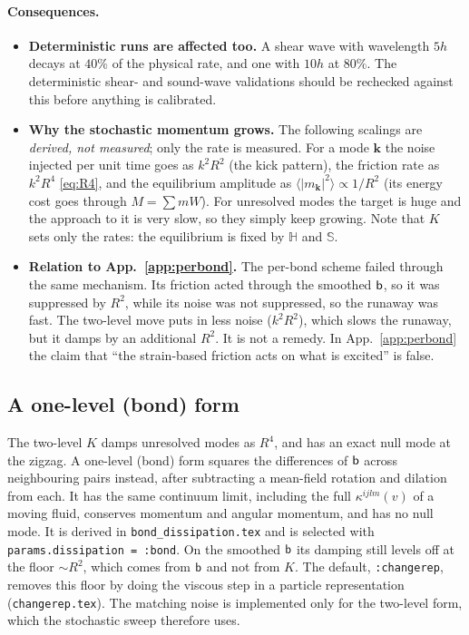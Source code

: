 \documentclass[12pt,aps,preprint,nofootinbib,noshowkeys,noshowpacs,longbibliography,superscriptaddress,tightenlines]{revtex4-2}
\def\Sbb{{\mathbb S}}
\def\bbeta{{\sf b}}
\def\app#1{App.~\ref{#1}}
\begin{document}
\paragraph{Consequences.}
\begin{itemize}
  \item \textbf{Deterministic runs are affected too.}  A shear wave with
        wavelength $5h$ decays at $40\%$ of the physical rate, and one with
        $10h$ at $80\%$.  The deterministic shear- and sound-wave validations
        should be rechecked against this before anything is calibrated.
  \item \textbf{Why the stochastic momentum grows.}  The following scalings are
        \emph{derived, not measured}; only the rate is measured.  For a mode
        $\mathbf k$ the noise injected per unit time goes as $k^2R^2$ (the
        kick pattern), the friction rate as $k^2R^4$ \eqref{eq:R4}, and the
        equilibrium amplitude as $\langle|m_{\mathbf k}|^2\rangle\propto1/R^2$
        (its energy cost goes through $M=\sum mW$).  For unresolved modes the
        target is huge and the approach to it is very slow, so they simply keep
        growing.  Note that $K$ sets only the rates: the equilibrium is fixed by
        $\mathbb H$ and $\Sbb$.
  \item \textbf{Relation to \app{app:perbond}.}  The per-bond scheme failed
        through the same mechanism.  Its friction acted through the smoothed
        $\bbeta$, so it was suppressed by $R^2$, while its noise was not
        suppressed, so the runaway was fast.  The two-level move puts in less
        noise ($k^2R^2$), which slows the runaway, but it damps by an
        additional $R^2$.  It is not a remedy.  In \app{app:perbond} the
        claim that ``the strain-based friction acts on what is excited'' is
        false.
\end{itemize}

\subsection{A one-level (bond) form}
\label{sec:bond}

The two-level $K$ damps unresolved modes as $R^4$, and has an exact null mode
at the zigzag.  A one-level (bond) form squares the differences of $\bbeta$
across neighbouring pairs instead, after subtracting a mean-field rotation and
dilation from each.  It has the same continuum limit, including the full
$\kappa^{ijlm}(v)$ of a moving fluid, conserves momentum and angular momentum,
and has no null mode.  It is derived in \texttt{bond\_dissipation.tex} and
is selected with \texttt{params.dissipation = :bond}.  On the smoothed $\bbeta$
its damping still levels off at the floor $\sim R^2$, which comes from $\bbeta$
and not from $K$.  The default, \texttt{:changerep}, removes this floor by doing
the viscous step in a particle representation (\texttt{changerep.tex}).  The
matching noise is implemented only for the two-level form, which the stochastic
sweep therefore uses.
\end{document}
